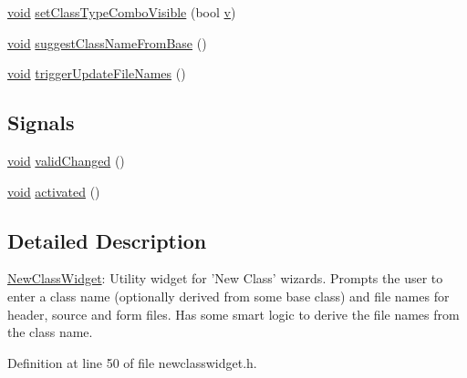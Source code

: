 \begin{DoxyCompactItemize}
\item 
\hyperlink{group___u_a_v_objects_plugin_ga444cf2ff3f0ecbe028adce838d373f5c}{void} \hyperlink{class_utils_1_1_new_class_widget_aad6a1f983a3d59926fb6e4b720b04dab}{set\-Class\-Type\-Combo\-Visible} (bool \hyperlink{glext_8h_a14cfbe2fc2234f5504618905b69d1e06}{v})
\item 
\hyperlink{group___u_a_v_objects_plugin_ga444cf2ff3f0ecbe028adce838d373f5c}{void} \hyperlink{class_utils_1_1_new_class_widget_ad48d60f3a08cd63f585d70459c168bbe}{suggest\-Class\-Name\-From\-Base} ()
\item 
\hyperlink{group___u_a_v_objects_plugin_ga444cf2ff3f0ecbe028adce838d373f5c}{void} \hyperlink{class_utils_1_1_new_class_widget_a362e135893f1c158324cf654ae8e59ee}{trigger\-Update\-File\-Names} ()
\end{DoxyCompactItemize}
\subsection*{Signals}
\begin{DoxyCompactItemize}
\item 
\hyperlink{group___u_a_v_objects_plugin_ga444cf2ff3f0ecbe028adce838d373f5c}{void} \hyperlink{class_utils_1_1_new_class_widget_a603d6f317cf4d6bea477ae93a153ce2f}{valid\-Changed} ()
\item 
\hyperlink{group___u_a_v_objects_plugin_ga444cf2ff3f0ecbe028adce838d373f5c}{void} \hyperlink{class_utils_1_1_new_class_widget_afdf63ac05df1b4688fbf3b2999a4c524}{activated} ()
\end{DoxyCompactItemize}


\subsection{Detailed Description}
\hyperlink{class_utils_1_1_new_class_widget}{New\-Class\-Widget}\-: Utility widget for 'New Class' wizards. Prompts the user to enter a class name (optionally derived from some base class) and file names for header, source and form files. Has some smart logic to derive the file names from the class name. 

Definition at line 50 of file newclasswidget.\-h.



